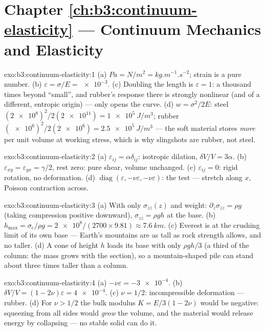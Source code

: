 \section*{Chapter \ref{ch:b3:continuum-elasticity} --- Continuum Mechanics and Elasticity}

\begin{solution}{exo:b3:continuum-elasticity:1}
(a) $\unit{Pa} = \unit{N/m^2} = \unit{kg.m^{-1}.s^{-2}}$; strain is a
pure number. (b) $\varepsilon = \sigma/E = \num{e-3}$. (c) Doubling
the length is $\varepsilon = 1$: a thousand times beyond ``small'',
and rubber's response there is strongly nonlinear (and of a different,
entropic origin) ---  only opens the curve. (d) $w =
\sigma^2/2E$: steel $(\num{2e8})^2/2(\num{2e11}) =
\qty{1e5}{J/m^3}$; rubber $(\num{e6})^2/2(\num{2e6}) =
\qty{2.5e5}{J/m^3}$ --- the soft material stores \emph{more} per unit
volume at working stress, which is why slingshots are rubber, not
steel.
\end{solution}

\begin{solution}{exo:b3:continuum-elasticity:2}
(a) $\varepsilon_{ij} = \alpha\delta_{ij}$: isotropic dilation,
$\delta V/V = 3\alpha$. (b) $\varepsilon_{xy} = \varepsilon_{yx} =
\gamma/2$, rest zero: pure shear, volume unchanged. (c)
$\varepsilon_{ij} = 0$: rigid rotation, no deformation. (d)
$\operatorname{diag}(\varepsilon, -\nu\varepsilon, -\nu\varepsilon)$:
the  test --- stretch along $x$, Poisson contraction across.
\end{solution}

\begin{solution}{exo:b3:continuum-elasticity:3}
(a) With only $\sigma_{zz}(z)$ and weight: $\partial_z\sigma_{zz} =
\rho g$ (taking compression positive downward), $\sigma_{zz} = \rho
gh$ at the base. (b) $h_{\max} = \sigma_{\text{c}}/\rho g =
\num{2e8}/(2700 \times 9.81) \approx \qty{7.6}{km}$. (c) Everest is at
the crushing limit of its own base --- Earth's mountains are as tall
as rock strength allows, and no taller. (d) A cone of height $h$ loads
its base with only $\rho gh/3$ (a third of the column: the mass grows
with the section), so a mountain-shaped pile can stand about three
times taller than a column.
\end{solution}

\begin{solution}{exo:b3:continuum-elasticity:4}
(a) $-\nu\varepsilon = \num{-3e-4}$. (b) $\delta V/V = (1 -
2\nu)\varepsilon = \num{4e-4}$. (c) $\nu = 1/2$: incompressible
deformation --- rubber. (d) For $\nu > 1/2$ the bulk modulus $K =
E/3(1 - 2\nu)$ would be negative: squeezing from all sides would
\emph{grow} the volume, and the material would release energy by
collapsing --- no stable solid can do it.
\end{solution}

